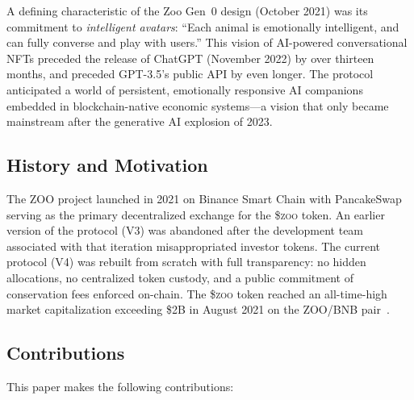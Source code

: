 \documentclass[11pt,letterpaper]{article}
\newcommand{\ZOO}{\$\textsc{zoo}}
\begin{document}
A defining characteristic of the Zoo Gen~0 design (October 2021) was its commitment to \emph{intelligent avatars}: ``Each animal is emotionally intelligent, and can fully converse and play with users.''  This vision of AI-powered conversational NFTs preceded the release of ChatGPT (November 2022) by over thirteen months, and preceded GPT-3.5's public API by even longer.  The protocol anticipated a world of persistent, emotionally responsive AI companions embedded in blockchain-native economic systems---a vision that only became mainstream after the generative AI explosion of 2023.

\subsection{History and Motivation}

The ZOO project launched in 2021 on Binance Smart Chain with PancakeSwap~\cite{pancakeswap}
serving as the primary decentralized exchange for the \ZOO{} token.  An earlier version of
the protocol (V3) was abandoned after the development team associated with that iteration
misappropriated investor tokens.  The current protocol (V4) was rebuilt from scratch with
full transparency: no hidden allocations, no centralized token custody, and a public
commitment of conservation fees enforced on-chain.  The \ZOO{} token
reached an all-time-high market capitalization exceeding \$2B in August 2021 on the
ZOO/BNB pair~\cite{poocoin2021}.

\subsection{Contributions}

This paper makes the following contributions:
\end{document}

